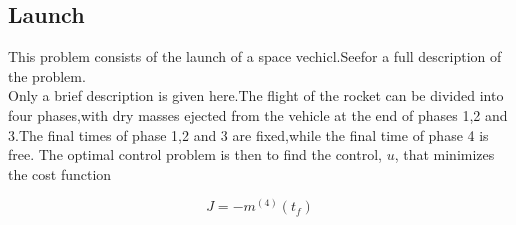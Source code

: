\documentclass[10pt]{article}
\begin{document}
\begin{figure}[h]
	\end{figure}
	\clearpage
	\subsection{Launch}
	This problem consists of the launch of a space vechicl.See\cite{benson2005gauss}for a full description of the problem.\\Only a brief description is given here.The flight of the rocket can be divided  into four phases,with dry masses ejected from the vehicle at the end of phases 1,2 and 3.The final times of phase 1,2 and  3 are fixed,while the final time of phase 4 is free.
	The optimal control problem is then to find the control, ${ u}$,
    that minimizes the cost function
    
    \begin{equation}
    J=-m^{(4)}(t_f)
    \end{equation}
    
\end{document}
